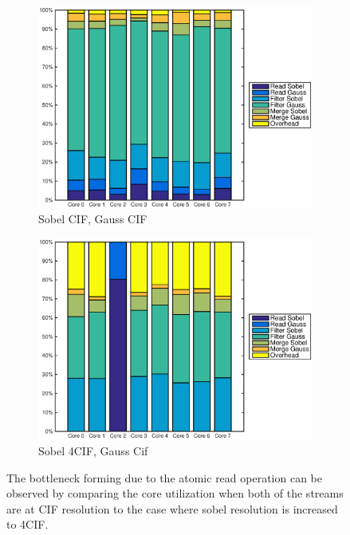 \begin{figure}
    \centering
    \begin{subfigure}[t]{0.49\textwidth}
        \centering
        \includegraphics[width=0.99\linewidth]{images/openem_cifcif_8cores_eo.eps}
        \caption{Sobel CIF, Gauss CIF}
        \label{fig:oem8coreeo}
    \end{subfigure}
    \begin{subfigure}[t]{0.49\textwidth}
        \centering
        \includegraphics[width=0.99\linewidth]{images/openem_sobel4cif_gausscif_eo.eps}
        \caption{Sobel 4CIF, Gauss Cif}
        \label{fig:oem8coreeosobel4cif}
    \end{subfigure}
    \caption{The bottleneck forming due to the atomic read operation can be observed by comparing the core utilization when both of the streams are at CIF resolution to the case where sobel resolution is increased to 4CIF.}
\end{figure}

